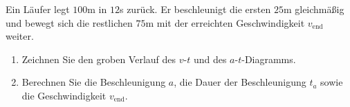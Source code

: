 \begin{ExerciseBlock}
Ein Läufer legt $100$m in $12$s zurück. Er beschleunigt die ersten $25$m gleichmäßig und bewegt sich die restlichen $75$m mit der erreichten Geschwindigkeit $v_\text{end}$ weiter.

\begin{enumerate}
	\item Zeichnen Sie den groben Verlauf des $v$-$t$ und des $a$-$t$-Diagramms.
	\item Berechnen Sie die Beschleunigung $a$, die Dauer der Beschleunigung $t_a$ sowie die Geschwindigkeit $v_\text{end}$.
\end{enumerate}
\end{ExerciseBlock}
